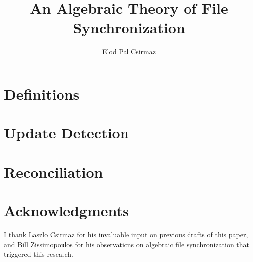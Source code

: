 \documentclass[12pt]{article}
\title{An Algebraic Theory of File Synchronization}
\author{Elod Pal Csirmaz\\
\texttt{\rot{\rot{maz.}{csir}{ep}com}{@}{elod}}}
\begin{document}
\maketitle
\begin{abstract}



\end{abstract}







\section{Definitions}\label{sec_def}











\section{Update Detection}\label{sec_update}









\section{Reconciliation}\label{sec_rec}





















\section{Acknowledgments}

I thank Laszlo Csirmaz for his invaluable input on previous drafts of this paper,
and Bill Zissimopoulos for his observations on algebraic file synchronization that triggered this research.


\begin{thebibliography}{99}



\end{thebibliography}
\end{document}
